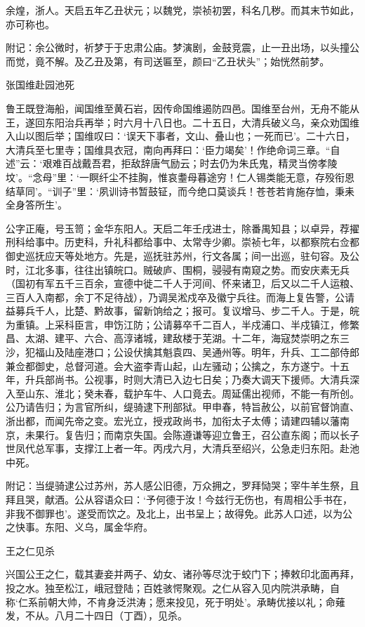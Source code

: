 \documentclass[]{article}
\begin{document}
余煌，浙人。天启五年乙丑状元；以魏党，崇祯初罢，科名几秽。而其末节如此，亦可称也。

附记：余公微时，祈梦于于忠肃公庙。梦演剧，金鼓竞震，止一丑出场，以头撞公而觉，竟不解。及乙丑及第，有司送匾至，颜曰``乙丑状头''；始恍然前梦。

张国维赴园池死

鲁王既登海船，闻国维至黄石岩，因传命国维遏防四邑。国维至台州，无舟不能从王，遂回东阳治兵再举；时六月十八日也。二十五日，大清兵破义乌，亲众劝国维入山以图后举；国维叹曰：`误天下事者，文山、叠山也；一死而已'。二十六日，大清兵至七里寺；国维具衣冠，南向再拜曰：`臣力竭矣'！作绝命词三章。``自述''云：`艰难百战戴吾君，拒敌辞唐气励云；时去仍为朱氏鬼，精灵当傍孝陵坟'。``念母''里：`一瞑纤尘不挂胸，惟哀耋母暮途穷！仁人锡类能无意，存殁衔恩结草同'。``训子''里：`夙训诗书暂鼓钲，而今绝口莫谈兵！苍苍若肯施存恤，秉耒全身答所生'。

公字正庵，号玉笥；金华东阳人。天启二年壬戌进士，除番禺知县；以卓异，荐擢刑科给事中。历吏科，升礼科都给事中、太常寺少卿。崇祯七年，以都察院右佥都御史巡抚应天等处地方。先是，巡抚驻苏州，行文各属；间一出巡，驻句容。及公时，江北多事，往往出镇皖口。贼破庐、围桐，骎骎有南窥之势。而安庆素无兵（国初有军五千三百余，宣德中徙二千人于河间、怀来诸卫，后又以二千人运粮、三百人入南都，余丁不足待战），乃调吴淞戍卒及徽宁兵往。而海上复告警，公请益募兵千人，比楚、黔故事，留新饷给之；报可。复议增马、步二千人。于是，皖为重镇。上采科臣言，申饬江防；公请募卒千二百人，半戍浦口、半戍镇江，修繁昌、太湖、建平、六合、高淳诸城，建敌楼于芜湖。十二年，海寇焚崇明之东三沙，犯福山及陆座港口；公设伏擒其魁袁四、吴通州等。明年，升兵、工二部侍郎兼佥都御史，总督河道。会大盗李青山起，山左骚动；公擒之，东方遂宁。十五年，升兵部尚书。公视事，时则大清已入边七日矣；乃奏大调天下援师。大清兵深入至山东、淮北；癸未春，载护车牛、人口竟去。周延儒出视师，不能一有所创。公乃请告归；为言官所纠，缇骑逮下刑部狱。甲申春，特旨赦公，以前官督饷直、浙出都，而闻先帝之变。宏光立，授戎政尚书，加衔太子太傅；请建四辅以藩南京，未果行。复告归；而南京失国。会陈遵谦等迎立鲁王，召公直东阁；而以长子世凤代总军事，支撑江上者一年。丙戌六月，大清兵至绍兴，公急走归东阳。赴池中死。

附记：当缇骑逮公过苏州，苏人感公旧德，万众拥之，罗拜恸哭；宰牛羊生祭，且拜且哭，献酒。公从容语众曰：`予何德于汝！今兹行无伤也，有周相公手书在，非我不御罪也'。遂受而饮之。及北上，出书呈上；故得免。此苏人口述，以为公之快事。东阳、义乌，属金华府。

王之仁见杀

兴国公王之仁，载其妻妾并两子、幼女、诸孙等尽沈于蛟门下；捧敕印北面再拜，投之水。独至松江，峨冠登陆；百姓骇愕聚观。之仁从容入见内院洪承畴，自称`仁系前朝大帅，不肯身泛洪涛；愿来投见，死于明处'。承畴优接以礼；命薙发，不从。八月二十四日（丁酉），见杀。
\end{document}
